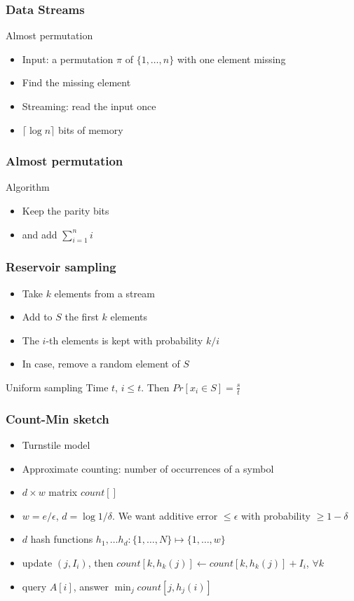 \documentclass[12pt,aspectratio=169]{beamer}
\begin{document}
\begin{frame}\frametitle{Data Streams}
  \begin{block}{Almost permutation}
    \begin{itemize}
    \item
      Input: a permutation $\pi$ of $\{1, \ldots , n\}$ with one element missing
    \item
      Find the missing element
    \item
      Streaming: read the input once
    \item
      $\lceil \log n \rceil$ bits of memory
    \end{itemize}
  \end{block}
\end{frame}  

\begin{frame}\frametitle{Almost permutation}
  \begin{block}{Algorithm}
    \begin{itemize}
    \item
      Keep the parity bits
    \item
      and add $\sum_{i=1}^{n} i$
    \end{itemize}
  \end{block}
\end{frame}

\begin{frame}\frametitle{Reservoir sampling}
  \begin{itemize}
  \item
    Take $k$ elements from a stream
  \item
    Add to $S$ the first $k$ elements
  \item
    The $i$-th elements is kept with probability $k/i$
  \item
    In case, remove a random element of $S$
  \end{itemize}
  \begin{block}{Uniform sampling}
    Time $t$, $i\le t$.
%
    Then $Pr[x_{i}\in S] = \frac{s}{t}$
  \end{block}
\end{frame}

\begin{frame}\frametitle{Count-Min sketch}
  \begin{itemize}
    \item
      Turnstile model
    \item
    Approximate counting: number of occurrences of a symbol
  \item
    $d\times w$ matrix  $count[]$
  \item
    $w=e/\epsilon$, $d=\log 1/\delta$.
We want additive error $\le\epsilon$ with probability $\ge 1-\delta$
  \item
    $d$ hash functions $h_{1}, \ldots h_{d}: \{1, \ldots, N\}\mapsto \{1, \ldots , w\}$
  \item
    update $(j, I_{i})$, then $count[k, h_{k}(j)] \gets count[k, h_{k}(j)] + I_{i}$,
    $\forall k$
  \item
    query $A[i]$, answer $\min_{j} count[j, h_{j}(i)]$
  \end{itemize}
\end{frame}
\end{document}
